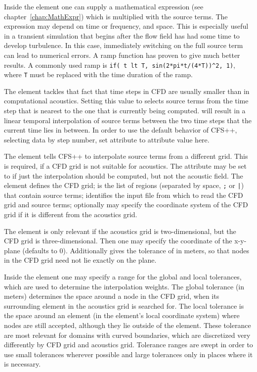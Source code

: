 Inside the  element one can supply a mathematical expression
(see chapter~\ref{chap:MathExpr}) which is multiplied with the source terms.
The expression may depend on time or frequency, and space. This is especially
useful in a transient simulation that begins after the flow field has had some
time to develop turbulence. In this case, immediately switching on the full
source term can lead to numerical errors. A ramp function has proven to give
much better results. A commonly used ramp is
\verb|if( t lt T, sin(2*pi*t/(4*T))^2, 1)|, where \texttt{T} must be replaced
with the time duration of the ramp.

The  element tackles that fact that time steps in CFD are
usually smaller than in computational acoustics. Setting this value to
 selects source terms from the time step that is nearest to
the
one that is currently being computed.  will result in a
linear temporal interpolation of source terms between the two time steps that
the current time lies in between. In order to use the default behavior of
CFS++, selecting data by step number, set attribute 
to attribute value  here.

The  element tells CFS++ to interpolate source terms from
a different grid. This is required, if a CFD grid is not suitable for
acoustics. The attribute  may be set to
 if
just the interpolation should be computed, but not the acoustic field. The
 element defines the CFD grid;  is the list
of regions (separated by space, \verb|;| or \verb#|#) that contain
source terms;  identifies the input file from which to read
the
CFD grid and source terms; optionally  may specify the
coordinate system of the CFD grid if it is different from the acoustics grid.

The  element is only relevant if the acoustics grid is
two-dimensional, but the CFD grid is three-dimensional. Then one may specify
the  coordinate of the x-y-plane (defaults to 0). Additionally
 gives the tolerance of  in meters, so that nodes in
the
CFD grid need not lie exactly on the plane.

Inside the  element one may specify a range for the global
and local tolerances, which are used to determine the interpolation weights.
The global tolerance (in meters) determines the space around a node in the CFD
grid, when its surrounding element in the acoustics grid is searched for. The
local tolerance is the space around an element (in the element's local
coordinate system) where nodes are still accepted, although they lie outside of
the element. These tolerance are most relevant for domains with curved
boundaries, which are discretized very differently by CFD grid and acoustics
grid. Tolerance ranges are swept in order to use small tolerances wherever
possible and large tolerances only in places where it is necessary.

